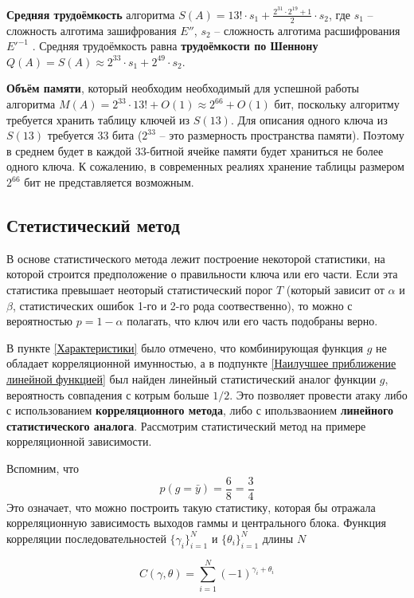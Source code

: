 \documentclass[a4paper,12pt]{article}
\theoremstyle{definition}
\begin{document}
	\textbf{Средняя трудоёмкость} алгоритма $S(A)= 13! \cdot s_1 + \frac{2^{31} \cdot 2^{19} + 1}{2} \cdot s_2 $, где $s_1$ -- сложность алготима зашифрования $E''$, $s_2$ -- сложность алготима расшифрования $E'^{-1}$ . Средняя трудоёмкость равна \textbf{трудоёмкости по Шеннону} $Q(A) = S(A) \approx 2^{33} \cdot s_1 + 2^{49} \cdot s_2$.
	
	\textbf{Объём памяти}, который необходим необходимый для успешной работы алгоритма $M(A) = 2^{33} \cdot 13! + O(1) \approx 2^{66} + O(1)$ бит, поскольку алгоритму требуется хранить таблицу ключей из $S(13)$. Для описания одного ключа из $S(13)$ требуется 33 бита ($2^{33}$ -- это размерность пространства памяти). Поэтому в среднем будет в каждой 33-битной ячейке памяти будет храниться не более одного ключа. К сожалению, в современных реалиях хранение таблицы размером $2^{66}$ бит не представляется возможным.
	

	\subsection{Стетистический метод}
	
	В основе статистического метода лежит построение некоторой статистики, на которой строится предположение о правильности ключа или его части. Если эта статистика превышает неоторый статистический порог $T$ (который зависит от $\alpha$ и $\beta$, статистических ошибок 1-го и 2-го рода соотвественно), то можно с вероятностью $p=1-\alpha$ полагать, что ключ или его часть подобраны верно.
	
	В пункте \ref{Характеристики} было отмечено, что комбинирующая функция $g$ не обладает корреляционной имунностью, а в подпункте \ref{Наилучшее приближение линейной функцией} был найден линейный статистический аналог функции $g$, вероятность совпадения с котрым больше $1/2$. Это позволяет провести атаку либо с использованием \textbf{корреляционного метода}, либо с ипользваонием \textbf{линейного статистического аналога}. Рассмотрим статистический метод на примере корреляционной зависимости.
	
	Вспомним, что 
	\[ p(g= \bar{y}) = \frac{6}{8} = \frac{3}{4} \]
	Это означает, что можно построить такую статистику, которая бы отражала корреляционную зависимость выходов гаммы и центрального блока. Функция корреляции последовательностей $\{\gamma_i\}_{i=1}^N$ и $\{\theta_i\}_{i=1}^N$ длины $N$
	
	\[  C(\gamma, \theta) = \sum_{i=1}^{N} \left(-1\right)^{\gamma_i +\theta_i} \]
	
\end{document}
